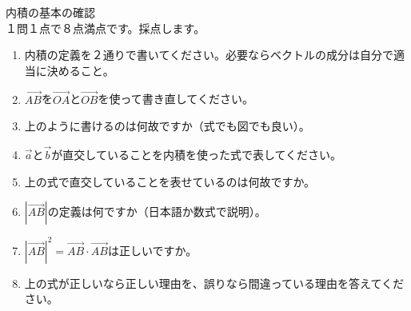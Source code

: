 \documentclass[12pt,a4paper]{jsarticle}
\begin{document}
内積の基本の確認
\\１問１点で８点満点です。採点します。
\begin{enumerate}
    \item 内積の定義を２通りで書いてください。必要ならベクトルの成分は自分で適当に決めること。
    \item $\overrightarrow{AB}$を$\overrightarrow{OA}$と$\overrightarrow{OB}$を使って書き直してください。
    \item 上のように書けるのは何故ですか（式でも図でも良い）。
    \item $\overrightarrow{a}$と$\overrightarrow{b}$が直交していることを内積を使った式で表してください。
    \item 上の式で直交していることを表せているのは何故ですか。
    \item $\left| \overrightarrow{AB} \right|$の定義は何ですか（日本語か数式で説明）。
    \item $\left| \overrightarrow{AB} \right|^2=\overrightarrow{AB}\cdot \overrightarrow{AB}$は正しいですか。
    \item 上の式が正しいなら正しい理由を、誤りなら間違っている理由を答えてください。
\end{enumerate}
\end{document}
